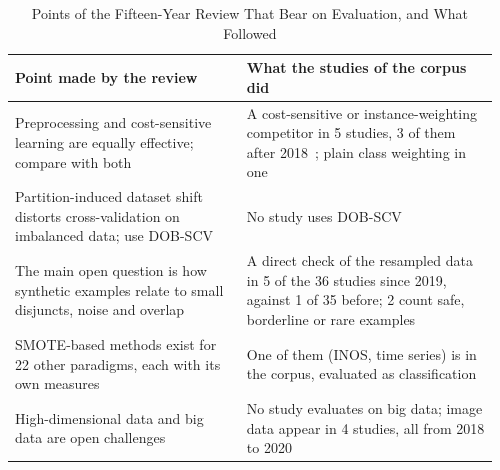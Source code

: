 \begin{table}[t]
  \caption{Points of the Fifteen-Year Review That Bear on Evaluation, and What Followed}
  \label{tab:empirical-review15}
  \footnotesize
  \setlength{\tabcolsep}{4pt}
  \begin{tabular}{@{}>{\raggedright\arraybackslash}p{0.46\linewidth}>{\raggedright\arraybackslash}p{0.5\linewidth}@{}}
    \toprule
    Point made by the review~\parencite{fernandez2018smote} & What the studies of the corpus did\\
    \midrule
    Preprocessing and cost-sensitive learning are equally effective; compare with both~\parencite{lopez2012analysis} & A cost-sensitive or instance-weighting competitor in 5 studies, 3 of them after 2018~\parencite{fernandez2013analysing,yang2018amdo,yao2021emdo,xie2022gdo,yadav2025ciso}; plain class weighting in one~\parencite{yadav2025ciso}\\
    Partition-induced dataset shift distorts cross-validation on imbalanced data; use DOB-SCV~\parencite{morenotorres2012study,lopez2014importance} & No study uses DOB-SCV\\
    The main open question is how synthetic examples relate to small disjuncts, noise and overlap & A direct check of the resampled data in 5 of the 36 studies since 2019, against 1 of 35 before; 2 count safe, borderline or rare examples~\parencite{liu2020spe,han2023glos}\\
    SMOTE-based methods exist for 22 other paradigms, each with its own measures & One of them (INOS, time series) is in the corpus, evaluated as classification~\parencite{cao2013inos}\\
    High-dimensional data and big data are open challenges~\parencite{blagus2013smote} & No study evaluates on big data; image data appear in 4 studies, all from 2018 to 2020\\
    \bottomrule
  \end{tabular}
\end{table}
